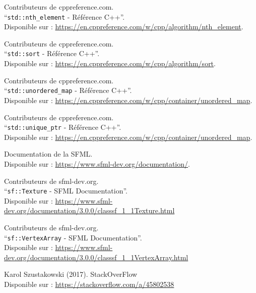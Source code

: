 \documentclass[a4paper,12pt]{report}
\begin{document}
\begin{thebibliography}{9}
        Contributeurs de cppreference.com.\\
        ``\texttt{std::nth\_element} - Référence C++''.\\
        Disponible sur : \url{https://en.cppreference.com/w/cpp/algorithm/nth_element}.

        Contributeurs de cppreference.com.\\
        ``\texttt{std::sort} - Référence C++''.\\
        Disponible sur : \url{https://en.cppreference.com/w/cpp/algorithm/sort}.

        Contributeurs de cppreference.com.\\
        ``\texttt{std::unordered\_map} - Référence C++''.\\
        Disponible sur : \url{https://en.cppreference.com/w/cpp/container/unordered_map}.

        Contributeurs de cppreference.com.\\
        ``\texttt{std::unique\_ptr} - Référence C++''.\\
        Disponible sur : \url{https://en.cppreference.com/w/cpp/container/unordered_map}.

        Documentation de la SFML. \\
        Disponible sur : \url{https://www.sfml-dev.org/documentation/}.

        Contributeurs de sfml-dev.org.\\
        ``\texttt{sf::Texture} - SFML Documentation''.\\
        Disponible sur : \url{https://www.sfml-dev.org/documentation/3.0.0/classsf_1_1Texture.html}

        Contributeurs de sfml-dev.org.\\
        ``\texttt{sf::VertexArray} - SFML Documentation''.\\
        Disponible sur : \url{https://www.sfml-dev.org/documentation/3.0.0/classsf_1_1VertexArray.html}

        Karol Szustakowski (2017).
        StackOverFlow \\
        Disponible sur : \url{https://stackoverflow.com/a/45802538}
    \end{thebibliography}
\end{document}
